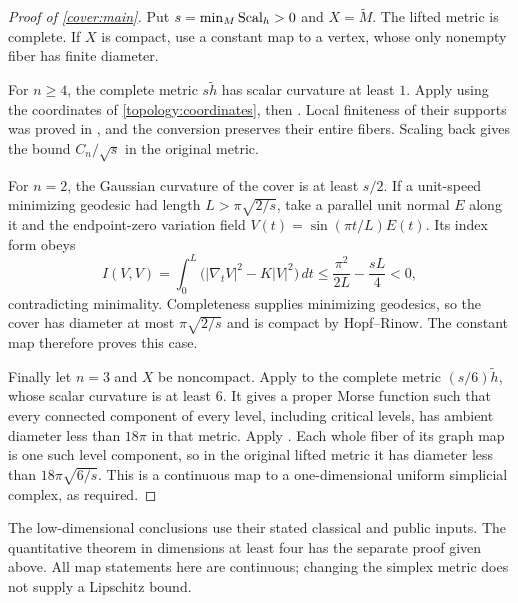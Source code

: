 \begin{proof}[Proof of \cref{cover:main}]
Put $s=\min_M\operatorname{Scal}_h>0$ and $X=\widetilde M$.  The lifted metric
is complete.  If $X$ is compact, use a constant map to a vertex,
whose only nonempty fiber has finite diameter.

For $n\ge4$, the complete metric $s\widetilde h$ has scalar
curvature at least $1$.  Apply  using the coordinates
of \eqref{topology:coordinates}, then .  Local
finiteness of their supports was proved in
, and the conversion preserves their
entire fibers.  Scaling back gives the bound $C_n/\sqrt{s}$ in
the original metric.

For $n=2$, the Gaussian curvature of the cover is at least $s/2$.
If a unit-speed minimizing geodesic had length $L>\pi\sqrt{2/s}$,
take a parallel unit normal $E$ along it and the endpoint-zero
variation field $V(t)=\sin(\pi t/L)E(t)$.  Its index form obeys
\[
 I(V,V)=\int_0^L\bigl(|\nabla_tV|^2-K|V|^2\bigr)\,dt
 \le \frac{\pi^2}{2L}-\frac{sL}{4}<0,
\]
contradicting minimality.  Completeness supplies minimizing geodesics,
so the cover has diameter at most $\pi\sqrt{2/s}$ and is compact
by Hopf--Rinow.  The constant map therefore proves this case.

Finally let $n=3$ and $X$ be noncompact.  Apply
\citet[Theorem~1.1, arXiv version~1]{liokumovichWang2023} to the
complete metric $(s/6)\widetilde h$, whose scalar curvature is at
least $6$.  It gives a proper Morse function such that every
connected component of every level, including critical levels, has
ambient diameter less than $18\pi$ in that metric.  Apply
.  Each whole fiber of its graph map is one such
level component, so in the original lifted metric it has diameter
less than $18\pi\sqrt{6/s}$.  This is a continuous map to a
one-dimensional uniform simplicial complex, as required.
\end{proof}

The low-dimensional conclusions use their stated classical and public
inputs.  The quantitative theorem in dimensions at least four has
the separate proof given above.  All map statements here are continuous;
changing the simplex metric does not supply a Lipschitz bound.
